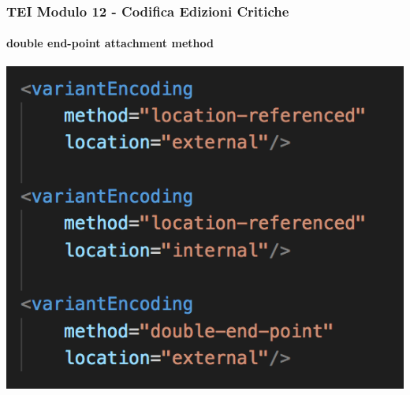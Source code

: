 





\begin{frame}
    \frametitle{TEI Modulo 12 - Codifica Edizioni Critiche}
    \framesubtitle{double end-point attachment method}
    \addtocounter{nframe}{1}
    

    \begin{center}
       \includegraphics[width=.95\textwidth]{imgs/variantEncoding.png}
    \end{center}

\end{frame}






